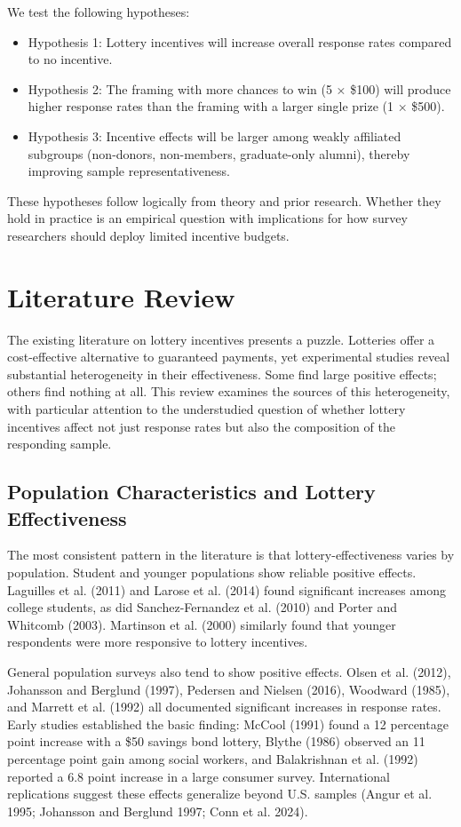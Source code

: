 \documentclass[12pt]{article}
\begin{document}
We test the following hypotheses:
\begin{itemize}
    \item Hypothesis 1: Lottery incentives will increase overall response rates compared to no incentive.
    \item Hypothesis 2: The framing with more chances to win (5 × \$100) will produce higher response rates than the framing with a larger single prize (1 × \$500).
    \item Hypothesis 3: Incentive effects will be larger among weakly affiliated subgroups (non-donors, non-members, graduate-only alumni), thereby improving sample representativeness.
\end{itemize}

These hypotheses follow logically from theory and prior research. Whether they hold in practice is an empirical question with implications for how survey researchers should deploy limited incentive budgets.

\section{Literature Review}

The existing literature on lottery incentives presents a puzzle. Lotteries offer a cost-effective alternative to guaranteed payments, yet experimental studies reveal substantial heterogeneity in their effectiveness. Some find large positive effects; others find nothing at all. This review examines the sources of this heterogeneity, with particular attention to the understudied question of whether lottery incentives affect not just response rates but also the composition of the responding sample.

\subsection{Population Characteristics and Lottery Effectiveness}

The most consistent pattern in the literature is that lottery-effectiveness varies by population. Student and younger populations show reliable positive effects. Laguilles et al. (2011) and Larose et al. (2014) found significant increases among college students, as did Sanchez-Fernandez et al. (2010) and Porter and Whitcomb (2003). Martinson et al. (2000) similarly found that younger respondents were more responsive to lottery incentives.

General population surveys also tend to show positive effects. Olsen et al. (2012), Johansson and Berglund (1997), Pedersen and Nielsen (2016), Woodward (1985), and Marrett et al. (1992) all documented significant increases in response rates. Early studies established the basic finding: McCool (1991) found a 12 percentage point increase with a \$50 savings bond lottery, Blythe (1986) observed an 11 percentage point gain among social workers, and Balakrishnan et al. (1992) reported a 6.8 point increase in a large consumer survey. International replications suggest these effects generalize beyond U.S. samples (Angur et al. 1995; Johansson and Berglund 1997; Conn et al. 2024).
\end{document}
